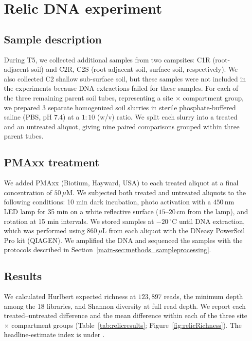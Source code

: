 \documentclass[11pt]{article}
\begin{document}
\section{Relic DNA experiment}\label{sup:relic}
\subsection{Sample description}
During T5, we collected additional samples from two campsites: C1R (root-adjacent soil) and C2R, C2S (root-adjacent soil, surface soil, respectively). We also collected C2 shallow sub-surface soil, but these samples were not included in the experiments because DNA extractions failed for these samples. For each of the three remaining parent soil tubes, representing a site $\times$ compartment group, we prepared $3$ separate homogenized soil slurries in sterile phosphate-buffered saline (PBS, pH $7.4$) at a $1:10$ (w/v) ratio. We split each slurry into a treated and an untreated aliquot, giving nine paired comparisons grouped within three parent tubes.

\subsection{PMAxx treatment}
We added PMAxx (Biotium, Hayward, USA) to each treated aliquot at a final concentration of $50\,\mu\mathrm{M}$. We subjected both treated and untreated aliquots to the following conditions: 10 min dark incubation, photo activation with a $450\,\mathrm{nm}$ LED lamp for 35 min on a white reflective surface ($15$--$20\,\mathrm{cm}$ from the lamp), and rotation at 15 min intervals. We stored samples at $-20\,^{\circ}\mathrm{C}$ until DNA extraction, which was performed using $860\,\mu\mathrm{L}$ from each aliquot with the DNeasy PowerSoil Pro kit (QIAGEN). We amplified the DNA and sequenced the samples with the protocols described in Section~\ref{main-sec:methods_sampleprocessing}.

\subsection{Results}
We calculated Hurlbert expected richness at $123{,}897$ reads, the minimum
depth among the 18 libraries, and Shannon diversity at full read depth. We report each treated--untreated difference and the mean difference within each of the three site $\times$ compartment groups (Table~\ref{tab:relicresults}; Figure~\ref{fig:relicRichness}). The headline-estimate index is under .
\end{document}
